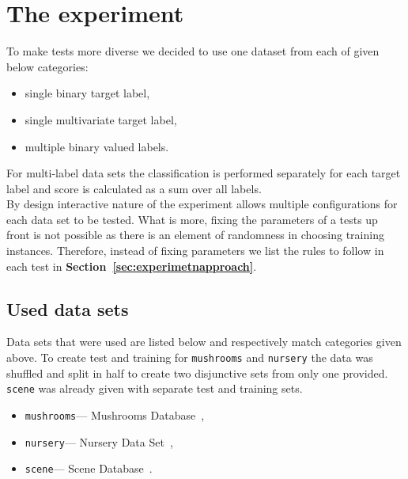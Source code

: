 \documentclass[12pt, a4paper, pdflatex]{report}
\begin{document}
\section{The experiment}
To make tests more diverse we decided to use one dataset from each of given below categories:
\begin{itemize}
\item single binary target label,
\item single multivariate target label,%
\item multiple binary valued labels.
\end{itemize}
For multi-label data sets the classification is performed separately for each target label and score is calculated as a sum over all labels.\\
By design interactive nature of the experiment allows multiple configurations for each data set to be tested. What is more, fixing the parameters of a tests up front is not possible as there is an element of randomness in choosing training instances. Therefore, instead of fixing parameters we list the rules to follow in each test in \textbf{Section~\ref{sec:experimetnapproach}}.

\subsection{Used data sets}
Data sets that were used are listed below and respectively match categories given above. To create test and training for \texttt{mushrooms} and \texttt{nursery} the data was shuffled and split in half to create two disjunctive sets from only one provided. \texttt{scene} was already given with separate test and training sets.
\begin{itemize}
\item \texttt{mushrooms}--- Mushrooms Database~\cite{mushroomsDS},
\item \texttt{nursery}--- Nursery Data Set~\cite{nurseryDS},
\item \texttt{scene}--- Scene Database~\cite{sceneDS}.
\end{itemize}
\end{document}
